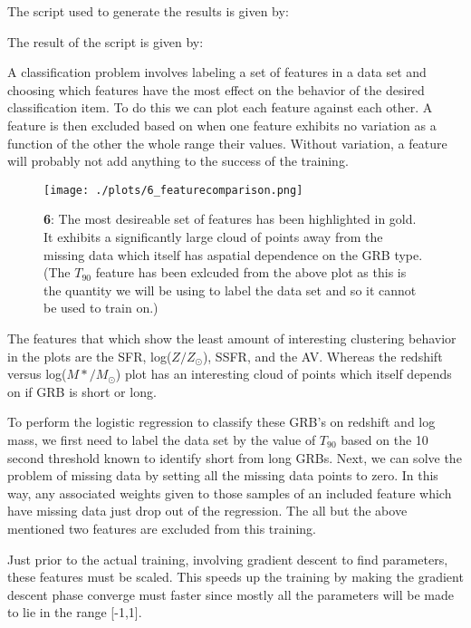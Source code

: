 
The script used to generate the results is given by:



The result of the script is given by:





A classification problem involves labeling a set of features in a data set and choosing which features have the most effect on the behavior of the desired classification item. To do this we can plot each feature against each other. A feature is then excluded based on when one feature exhibits no variation as a function of the other the whole range their values. Without variation, a feature will probably not add anything to the success of the training.


\begin{figure}[h!]
  \centering
  \texttt{[image: ./plots/6\_featurecomparison.png]}
  \caption{\textbf{6}: The most desireable set of features has been highlighted in gold. It exhibits a significantly large cloud of points away from the missing data which itself has aspatial dependence on the GRB type. (The $T_{90}$ feature has been exlcuded from the above plot as this  is the quantity we will be using to label the data set and so it cannot be used to train on.)}
  \label{fig:featurecomparison}
\end{figure}

The features that which show the least amount of interesting clustering behavior in the plots are the SFR, log($Z/Z_{\odot}$), SSFR, and the AV. Whereas the redshift versus log($M*/M_{\odot}$) plot has an interesting cloud of points which itself depends on if GRB is short or long.

To perform the logistic regression to classify these GRB's on redshift and log mass, we first need to label the data set by the value of $T_{90}$ based on the 10 second threshold known to identify short from long GRBs. Next, we can solve the problem of missing data by setting all the missing data points to zero. In this way, any associated weights given to those samples of an included feature which have missing data just drop out of the regression. The all but the above mentioned two features are excluded from this training.

Just prior to the actual training, involving gradient descent to find parameters, these features must be scaled. This speeds up the training by making the gradient descent phase converge must faster since mostly all the parameters will be made to lie in the range [-1,1].

